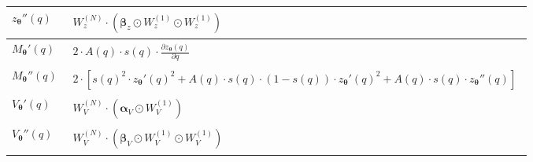\documentclass[a4paper, 12pt]{scrartcl}
\begin{document}
\begin{center}
\begin{tabular}{ll}
        \\[0.5em] \hline
        \noalign{\vspace{0.5em}}
        $z_{\bm{\theta}}''(q)$
        &
        $\begin{aligned}
            W_z^{(N)}
            \cdot
            \left(\bm{\beta}_z \odot W_z^{(1)} \odot W_z^{(1)}\right)
        \end{aligned}$ 
        \\[0.5em] \hline
        \noalign{\vspace{0.5em}}
        $M_{\bm{\theta}}'(q)$
        &
        $\begin{aligned}
            2 \cdot
            A(q)
            \cdot 
            s(q)
            \cdot 
            \frac{\partial z_{\bm{\theta}}(q)}{\partial q} 
        \end{aligned}$
        \\[0.5em] \hline
        \noalign{\vspace{0.5em}}
        $M_{\bm{\theta}}''(q)$
        &
        $\begin{aligned}
            2 \cdot 
            \left[
                s(q)^2 
                \cdot 
                z_{\bm{\theta}}'(q)^2
                + 
                A(q) \cdot s(q) \cdot (1-s(q)) \cdot 
                z_{\bm{\theta}}'(q)^2
                +
                A(q) \cdot s(q)
                \cdot 
                z_{\bm{\theta}}''(q)
            \right]
        \end{aligned}$
        \\[0.5em] \hline
        \noalign{\vspace{0.5em}}
        $V_{\bm{\theta}}'(q)$
        &
        $\begin{aligned}
            W_V^{(N)}
            \cdot
            \left(\bm{\alpha}_V \odot W_V^{(1)}\right)
        \end{aligned}$ 
        \\[0.5em] \hline
        \noalign{\vspace{0.5em}}
        $V_{\bm{\theta}}''(q)$
        &
        $\begin{aligned}
            W_V^{(N)}
            \cdot
            \left(\bm{\beta}_V \odot W_V^{(1)} \odot W_V^{(1)}\right)
        \end{aligned}$ 
    \end{tabular}
\end{center}
\end{document}
